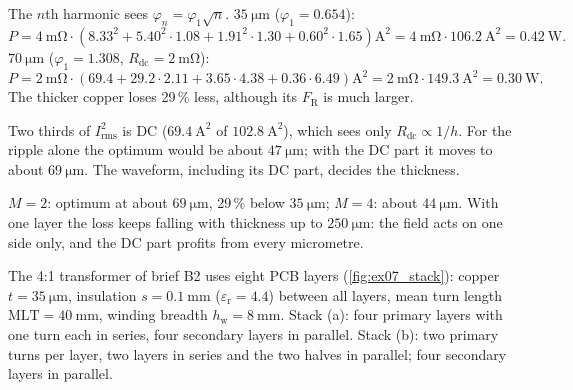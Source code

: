 \begin{solutionblock}
	The $n$th harmonic sees $\varphi_n=\varphi_1\sqrt{n}$. $\SI{35}{\micro\metre}$ ($\varphi_1=0.654$):
	\begin{equation}
		P=\SI{4}{\milli\ohm}\cdot\left(8.33^2+5.40^2\cdot1.08+1.91^2\cdot1.30+0.60^2\cdot1.65\right)\si{\square\ampere}=\SI{4}{\milli\ohm}\cdot\SI{106.2}{\square\ampere}=\SI{0.42}{\watt}.
	\end{equation}
	$\SI{70}{\micro\metre}$ ($\varphi_1=1.308$, $R_\mathrm{dc}=\SI{2}{\milli\ohm}$):
	\begin{equation}
		P=\SI{2}{\milli\ohm}\cdot\left(69.4+29.2\cdot2.11+3.65\cdot4.38+0.36\cdot6.49\right)\si{\square\ampere}=\SI{2}{\milli\ohm}\cdot\SI{149.3}{\square\ampere}=\SI{0.30}{\watt}.
	\end{equation}
	The thicker copper loses 29\,\% less, although its $F_\mathrm{R}$ is much larger.
\end{solutionblock}


\begin{solutionblock}
	Two thirds of $I_\mathrm{rms}^2$ is DC ($\SI{69.4}{\square\ampere}$ of $\SI{102.8}{\square\ampere}$), which sees only $R_\mathrm{dc}\propto1/h$. For the ripple alone the optimum would be about $\SI{47}{\micro\metre}$; with the DC part it moves to about $\SI{69}{\micro\metre}$. The waveform, including its DC part, decides the thickness.
\end{solutionblock}


\begin{solutionblock}
	$M=2$: optimum at about $\SI{69}{\micro\metre}$, 29\,\% below $\SI{35}{\micro\metre}$; $M=4$: about $\SI{44}{\micro\metre}$. With one layer the loss keeps falling with thickness up to $\SI{250}{\micro\metre}$: the field acts on one side only, and the DC part profits from every micrometre.
\end{solutionblock}



The 4:1 transformer of brief B2 uses eight PCB layers (\autoref{fig:ex07_stack}): copper $t=\SI{35}{\micro\metre}$, insulation $s=\SI{0.1}{\milli\metre}$ ($\varepsilon_\mathrm{r}=4.4$) between all layers, mean turn length $\mathrm{MLT}=\SI{40}{\milli\metre}$, winding breadth $h_\mathrm{w}=\SI{8}{\milli\metre}$. Stack (a): four primary layers with one turn each in series, four secondary layers in parallel. Stack (b): two primary turns per layer, two layers in series and the two halves in parallel; four secondary layers in parallel.

